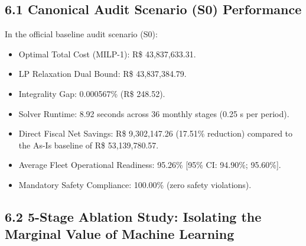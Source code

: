 \documentclass[10pt,a4paper,journal]{article}
\begin{document}
\subsection{6.1 Canonical Audit Scenario (S0) Performance}
In the official baseline audit scenario (S0):

\begin{itemize}
\item Optimal Total Cost (MILP-1): R\$ 43,837,633.31.
\end{itemize}
\begin{itemize}
\item LP Relaxation Dual Bound: R\$ 43,837,384.79.
\end{itemize}
\begin{itemize}
\item Integrality Gap: 0.000567\% (R\$ 248.52).
\end{itemize}
\begin{itemize}
\item Solver Runtime: 8.92 seconds across 36 monthly stages (0.25 s per period).
\end{itemize}
\begin{itemize}
\item Direct Fiscal Net Savings: R\$ 9,302,147.26 (17.51\% reduction) compared to the As-Is baseline of R\$ 53,139,780.57.
\end{itemize}
\begin{itemize}
\item Average Fleet Operational Readiness: 95.26\% [95\% CI: 94.90\%; 95.60\%].
\end{itemize}
\begin{itemize}
\item Mandatory Safety Compliance: 100.00\% (zero safety violations).
\end{itemize}
\subsection{6.2 5-Stage Ablation Study: Isolating the Marginal Value of Machine Learning}
\end{document}
